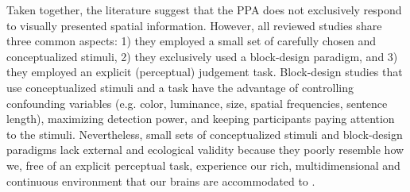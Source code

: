 \documentclass[english,11pt]{article}
\begin{document}
Taken together, the literature suggest that the PPA does not exclusively respond
to visually presented spatial information.
However, all reviewed studies share three common aspects:
1) they employed a small set of carefully chosen and conceptualized stimuli,
2) they exclusively used a block-design paradigm, and
3) they employed an explicit (perceptual) judgement task.
Block-design studies that use conceptualized stimuli and a task have the
advantage of controlling confounding variables (e.g. color, luminance, size,
spatial frequencies, sentence length), maximizing detection power, and keeping
participants paying attention to the stimuli.
Nevertheless, small sets of conceptualized stimuli and block-design paradigms
lack external and ecological validity \citep{westfall2016fixing,
hasson2004intersubject} because they poorly resemble how we, free of an explicit
perceptual task, experience our rich, multidimensional and continuous
environment that our brains are accommodated to
\citep{sonkusare2019naturalistic}.
\end{document}
